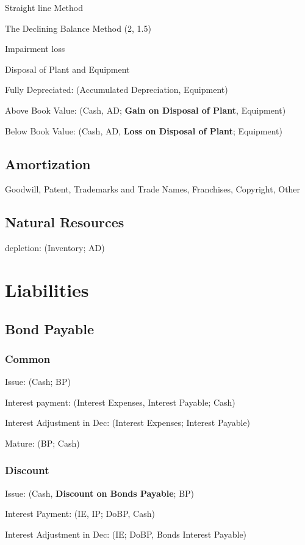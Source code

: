 \documentclass[10pt, a4paper]{article}
\begin{document}
    Straight line Method

    The Declining Balance Method (2, 1.5)

    Impairment loss

    Disposal of Plant and Equipment 

        \quad Fully Depreciated: (Accumulated Depreciation, Equipment)

        \quad Above Book Value: (Cash, AD; \textbf{Gain on Disposal of Plant}, Equipment)

        \quad Below Book Value: (Cash, AD, \textbf{Loss on Disposal of Plant}; Equipment)
\subsection*{Amortization}
    Goodwill, Patent, Trademarks and Trade Names, Franchises, Copyright, Other

\subsection*{Natural Resources}
    depletion: (Inventory; AD)

\section*{Liabilities}
    \subsection*{Bond Payable}
        \subsubsection*{Common}
            Issue: (Cash; BP)

            Interest payment: (Interest Expenses, Interest Payable; Cash) 

            Interest Adjustment in Dec: (Interest Expenses; Interest Payable)

            Mature: (BP; Cash)

        \subsubsection*{Discount}
            Issue: (Cash, \textbf{Discount on Bonds Payable}; BP)

            Interest Payment: (IE, IP; DoBP, Cash)

            Interest Adjustment in Dec: (IE; DoBP, Bonds Interest Payable) 
\end{document}
